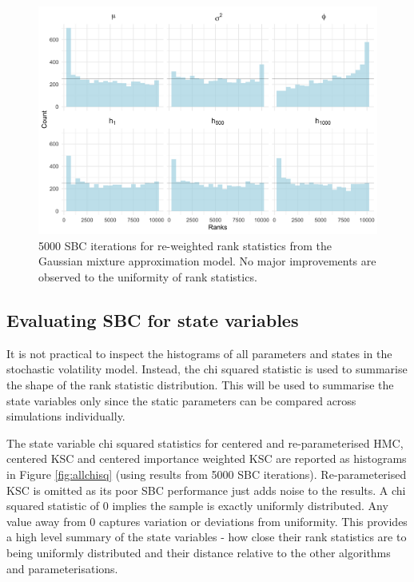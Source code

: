 \documentclass[12pt, a4paper]{article}
\begin{document}
    \begin{figure}[H]
        \centering
        \includegraphics[scale=0.1]{results/weighted_ksc_cp_5k.png}
        \caption{5000 SBC iterations for re-weighted rank statistics from the Gaussian mixture approximation model. No major improvements are observed to the uniformity of rank statistics.}
        \label{fig:reweight5k}
    \end{figure}

    \subsection{Evaluating SBC for state variables}
    It is not practical to inspect the histograms of all parameters and states in the stochastic volatility model. Instead, the chi squared statistic is used to summarise the shape of the rank statistic distribution. This will be used to summarise the state variables only since the static parameters can be compared across simulations individually. 

    The state variable chi squared statistics for centered and re-parameterised HMC, centered KSC and centered importance weighted KSC are reported as histograms in Figure \ref{fig:allchisq} (using results from 5000 SBC iterations). Re-parameterised KSC is omitted as its poor SBC performance just adds noise to the results. A chi squared statistic of 0 implies the sample is exactly uniformly distributed. Any value away from 0 captures variation or deviations from uniformity. This provides a high level summary of the state variables - how close their rank statistics are to being uniformly distributed and their distance relative to the other algorithms and parameterisations. 
    
\end{document}
